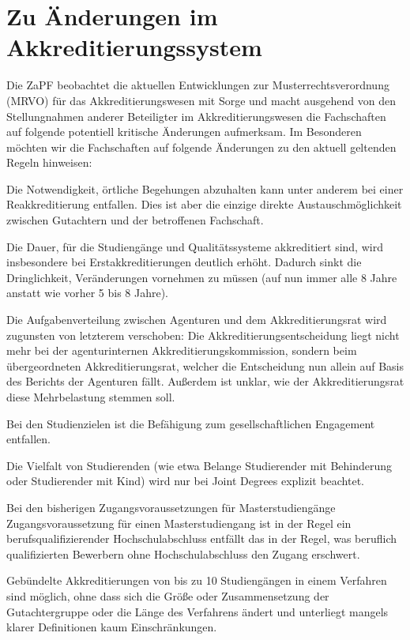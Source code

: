 \documentclass[DIV=calc]{scrartcl}
\begin{document}
\section*{Zu Änderungen im Akkreditierungssystem}
Die ZaPF beobachtet die aktuellen Entwicklungen
zur Musterrechtsverordnung (MRVO) für das Akkreditierungswesen mit Sorge und macht ausgehend von den Stellungnahmen anderer Beteiligter im Akkreditierungswesen die Fachschaften auf folgende potentiell kritische Änderungen aufmerksam.
Im Besonderen möchten wir die Fachschaften auf folgende Änderungen zu den aktuell geltenden Regeln hinweisen:
\begin{compactitem}
\item Die Notwendigkeit, örtliche Begehungen abzuhalten kann unter anderem bei einer Reakkreditierung entfallen. Dies ist aber die einzige direkte Austauschmöglichkeit zwischen Gutachtern und der betroffenen Fachschaft.
\item Die Dauer, für die Studiengänge und Qualitätssysteme akkreditiert sind, wird insbesondere bei Erstakkreditierungen deutlich erhöht. Dadurch sinkt die Dringlichkeit, Veränderungen vornehmen zu müssen (auf nun immer alle 8 Jahre anstatt wie vorher 5 bis 8 Jahre).
\item Die Aufgabenverteilung zwischen Agenturen und dem Akkreditierungsrat wird zugunsten von letzterem verschoben: Die Akkreditierungsentscheidung liegt nicht mehr bei der agenturinternen Akkreditierungskommission, sondern beim übergeordneten Akkreditierungsrat, welcher die Entscheidung nun allein auf Basis des Berichts der Agenturen fällt. Außerdem ist unklar, wie der Akkreditierungsrat diese Mehrbelastung stemmen soll.
\item Bei den Studienzielen ist die Befähigung zum gesellschaftlichen Engagement entfallen.
\item Die Vielfalt von Studierenden (wie etwa Belange Studierender mit Behinderung oder Studierender mit Kind) wird nur bei Joint Degrees explizit beachtet.
\item Bei den bisherigen Zugangsvoraussetzungen für Masterstudiengänge \glqq Zugangsvoraussetzung für einen Masterstudiengang ist in der Regel ein berufsqualifizierender Hochschulabschluss\grqq{} entfällt das \glqq in der Regel\grqq{}, was beruflich qualifizierten Bewerbern ohne Hochschulabschluss den Zugang erschwert.
\item Gebündelte Akkreditierungen von bis zu 10 Studiengängen in einem Verfahren sind möglich, ohne dass sich die Größe oder Zusammensetzung der Gutachtergruppe oder die Länge des Verfahrens ändert und unterliegt mangels klarer Definitionen kaum Einschränkungen.

\end{compactitem}
\end{document}

